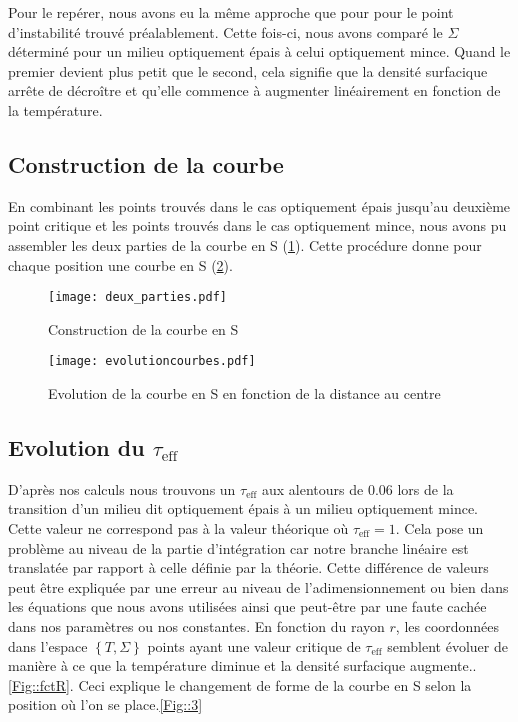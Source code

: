 Pour le repérer, nous avons eu la même approche que pour pour le point d'instabilité trouvé préalablement. Cette fois-ci, nous avons comparé le $\Sigma$ déterminé pour un milieu optiquement épais à celui optiquement mince. Quand le premier devient plus petit que le second, cela signifie que la densité surfacique arrête de décroître et qu'elle commence à augmenter linéairement en fonction de la température. 


\subsection{Construction de la courbe}

En combinant les points trouvés dans le cas optiquement épais jusqu'au deuxième point critique et les points trouvés dans le cas optiquement mince, nous avons pu assembler les deux parties de la courbe en S (\ref{Fig::construction_S}). Cette procédure donne pour chaque position une courbe en S (\ref{Fig::courbe_S_rayons}).

\begin{figure}[htb!]
	\centering
	\texttt{[image: deux\_parties.pdf]}
	\caption{Construction de la courbe en S}
	\label{Fig::construction_S}
\end{figure}

\begin{figure}[htb!]
	\centering
	\texttt{[image: evolutioncourbes.pdf]}
	\caption{Evolution de la courbe en S en fonction de la distance au centre}
	\label{Fig::courbe_S_rayons}
\end{figure}



\subsection{Evolution du $\tau_\textrm{eff}$}

D'après nos calculs nous trouvons un $\tau_\textrm{eff}$ aux alentours de $0.06$ lors de la transition d'un milieu dit optiquement épais à un milieu optiquement mince. Cette valeur ne correspond pas à la valeur théorique où $\tau_\textrm{eff} = 1$.
Cela pose un problème au niveau de la partie d'intégration car notre branche linéaire est translatée par rapport à celle définie par la théorie. 
Cette différence de valeurs peut être expliquée par une erreur au niveau de l’adimensionnement ou bien dans les équations que nous avons utilisées ainsi que peut-être par une faute cachée dans nos paramètres ou nos constantes. 
En fonction du rayon $r$, les coordonnées dans l'espace $\left\lbrace T, \Sigma\right\rbrace$ points ayant une valeur critique de $\tau_\textrm{eff}$ semblent évoluer de manière à ce que la température diminue et la densité surfacique augmente..\ref{Fig::fctR}. Ceci explique le changement de forme de la courbe en S selon la position où l'on se place.\ref{Fig::3}

